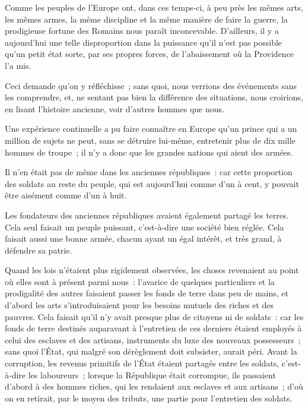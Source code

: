 \documentclass[french,twoside]{book} %
\newcommand\chaptercont{} %
\begin{document}
\chaptercont
\noindent Comme les peuples de l’Europe ont, dans ces temps-ci, à peu près les mêmes arts, les mêmes armes, la même discipline et la même manière de faire la guerre, la prodigieuse fortune des Romains nous paraît inconcevable. D’ailleurs, il y a aujourd’hui une telle disproportion dans la puissance qu’il n’est pas possible qu’un petit état sorte, par ses propres forces, de l’abaissement où la Providence l’a mis.\par
Ceci demande qu’on y réfléchisse ; sans quoi, nous verrions des événements sans les comprendre, et, ne sentant pas bien la différence des situations, nous croirions, en lisant l’histoire ancienne, voir d’autres hommes que nous.\par
Une expérience continuelle a pu faire connaître en Europe qu’un prince qui a un million de sujets ne peut, sans se détruire lui-même, entretenir plus de dix mille hommes de troupe ; il n’y a donc que les grandes nations qui aient des armées.\par
Il n’en était pas de même dans les anciennes républiques : car cette proportion des soldats au reste du peuple, qui est aujourd’hui comme d’un à cent, y pouvait être aisément comme d’un à huit.\par
Les fondateurs des anciennes républiques avaient également partagé les terres. Cela seul faisait un peuple puissant, c’est-à-dire une société bien réglée. Cela faisait aussi une bonne armée, chacun ayant un égal intérêt, et très grand, à défendre sa patrie.\par
Quand les lois n’étaient plus rigidement observées, les choses revenaient au point où elles sont à présent parmi nous : l’avarice de quelques particuliers et la prodigalité des autres faisaient passer les fonds de terre dans peu de mains, et d’abord les arts s’introduisaient pour les besoins mutuels des riches et des pauvres. Cela faisait qu’il n’y avait presque plus de citoyens ni de soldats : car les fonds de terre destinés auparavant à l’entretien de ces derniers étaient employés à celui des esclaves et des artisans, instruments du luxe des nouveaux possesseurs ; sans quoi l’État, qui malgré son dérèglement doit subsister, aurait péri. Avant la corruption, les revenus primitifs de l’État étaient partagés entre les soldats, c’est-à-dire les laboureurs ; lorsque la République était corrompue, ils passaient d’abord à des hommes riches, qui les rendaient aux esclaves et aux artisans ; d’où on en retirait, par le moyen des tributs, une partie pour l’entretien des soldats.\par
\end{document}
